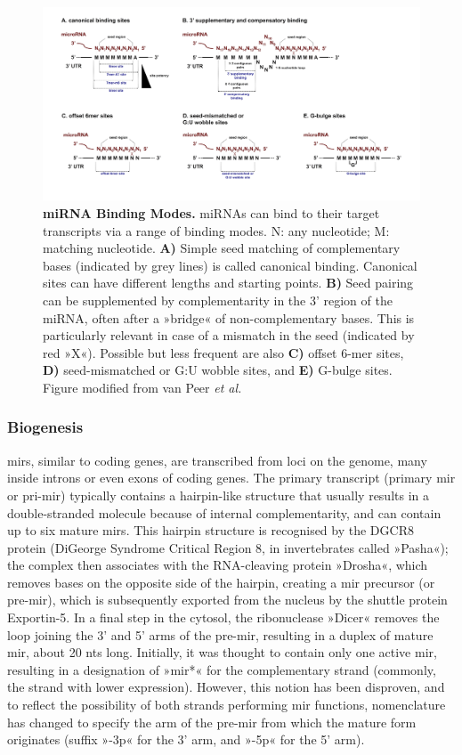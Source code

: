 \begin{figure}
\includegraphics[width=\textwidth]{figures/vanpeer2018-mirna-binding}
\caption[miRNA Binding Modes.]{\textbf{miRNA Binding Modes.} miRNAs can bind to their target transcripts via a range of binding modes. N: any nucleotide; M: matching nucleotide. \textbf{A)} Simple seed matching of complementary bases (indicated by grey lines) is called canonical binding. Canonical sites can have different lengths and starting points. \textbf{B)} Seed pairing can be supplemented by complementarity in the 3' region of the miRNA, often after a »bridge« of non-complementary bases. This is particularly relevant in case of a mismatch in the seed (indicated by red »X«). Possible but less frequent are also \textbf{C)} offset 6-mer sites, \textbf{D)} seed-mismatched or G:U wobble sites, and \textbf{E)} G-bulge sites. Figure modified from van Peer \emph{et al.}\cite{VanPeer2018}
\label{fig:vanpeer2018-mirna-binding}}
\end{figure}

\subsubsection{Biogenesis}
\acp{mir}, similar to coding genes, are transcribed from loci on the genome, many inside introns or even exons of coding genes.\cite{Rodriguez2004} The primary transcript (primary \ac{mir} or pri-\ac{mir}) typically contains a hairpin-like structure that usually results in a double-stranded molecule because of internal complementarity, and can contain up to six mature \acp{mir}. This hairpin structure is recognised by the DGCR8 protein (DiGeorge Syndrome Critical Region 8, in invertebrates called »Pasha«); the complex then associates with the RNA-cleaving protein »Drosha«, which removes bases on the opposite side of the hairpin, creating a \ac{mir} precursor (or pre-\ac{mir}), which is subsequently exported from the nucleus by the shuttle protein Exportin-5. In a final step in the cytosol, the ribonuclease »Dicer« removes the loop joining the 3' and 5' arms of the pre-\ac{mir}, resulting in a duplex of mature \ac{mir}, about 20 \acp{nt} long. Initially, it was thought to contain only one active \ac{mir}, resulting in a designation of »\ac{mir}*« for the complementary strand (commonly, the strand with lower expression). However, this notion has been disproven, and to reflect the possibility of both strands performing \ac{mir} functions, nomenclature has changed to specify the arm of the pre-\ac{mir} from which the mature form originates (suffix »-3p« for the 3' arm, and »-5p« for the 5' arm).

